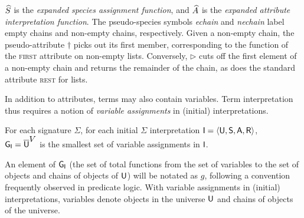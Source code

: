 \documentclass[output=paper
                ,modfonts
                ,nonflat
	        ,collection
	        ,collectionchapter
	        ,collectiontoclongg
 	        ,biblatex
                ,babelshorthands
                ,newtxmath
                ,draftmode
                ,colorlinks, citecolor=brown
]{./langsci/langscibook}
\begin{document}
{{$\widehat{S}$ is the \emph{expanded species assignment function}, and
$\widehat{A}$ is the  \emph{expanded attribute interpretation function}.
The pseudo-species symbols \textit{echain} and \textit{nechain} label
empty chains and non-empty chains, respectively. Given a non-empty
chain, the pseudo-attribute $\dagger$ picks out its first member,
corresponding to the function of the \textsc{first} attribute on non-empty
lists. Conversely, $\triangleright$ cuts off the first element
of a non-empty chain and returns the remainder of the chain, as does the
standard attribute \textsc{rest} for lists.

In addition to attributes, terms may also contain variables. Term
interpretation thus requires a notion of \emph{variable assignments} in
(initial) interpretations.

\begin{mydef}
  For each signature $\Sigma$,
  for each initial $\Sigma$ interpretation $\mathsf{I}=\langle\mathsf{U},\mathsf{S},\mathsf{A},\mathsf{R}\rangle$,\\
  $\mathsf{G}_{\mathsf{I}}=\overline{\mathsf{U}}^{\mbox{$V$}}$ is the smallest set of variable
  assignments in $\mathsf{I}$.
\end{mydef}

An element of $\mathsf{G}_{\mathsf{I}}$ (the set of total functions from the
set of variables to the set of objects and chains of objects of
$\mathsf{U}$) will be notated as $g$, following a convention frequently
observed in predicate logic.  With variable assignments in (initial)
interpretations, variables denote objects in the universe $\mathsf{U}$
and chains of objects of the universe.


}}
\end{document}
